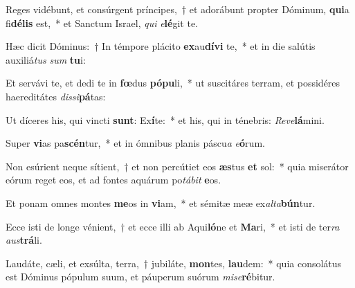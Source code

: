 \item Reges vidébunt, et consúrgent príncipes,~† et adorábunt propter Dóminum, \textbf{qui}a fi\textbf{dé}\textbf{lis} est,~* et Sanctum Israel, \textit{qui} \textit{e}\textbf{lé}git te.
\item Hæc dicit Dóminus:~† In témpore plácito \textbf{ex}au\textbf{dí}\textbf{vi} te,~* et in die salútis auxiliá\textit{tus} \textit{sum} \textbf{tu}i:
\item Et servávi te, et dedi te in \textbf{fœ}dus \textbf{pó}\textbf{pu}li,~* ut suscitáres terram, et possidéres haereditátes \textit{dis}\textit{si}\textbf{pá}tas:
\item Ut díceres his, qui vincti \textbf{sunt}: Ex\textbf{í}te:~* et his, qui in ténebris: \textit{Re}\textit{ve}\textbf{lá}mini.
\item Super \textbf{vi}as pa\textbf{scén}tur,~* et in ómnibus planis páscu\textit{a} \textit{e}\textbf{ó}rum.
\item Non esúrient neque sítient,~† et non percútiet eos \textbf{æs}tus \textbf{et} sol:~* quia miserátor eórum reget eos, et ad fontes aquárum po\textit{tá}\textit{bit} \textbf{e}os.
\item Et ponam omnes montes \textbf{me}os in \textbf{vi}am,~* et sémitæ meæ ex\textit{al}\textit{ta}\textbf{bún}tur.
\item Ecce isti de longe vénient,~† et ecce illi ab Aqui\textbf{ló}ne et \textbf{Ma}ri,~* et isti de ter\textit{ra} \textit{aus}\textbf{trá}li.
\item Laudáte, cæli, et exsúlta, terra,~† jubiláte, \textbf{mon}tes, \textbf{lau}dem:~* quia consolátus est Dóminus pópulum suum, et páuperum suórum \textit{mi}\textit{se}\textbf{ré}bitur.
